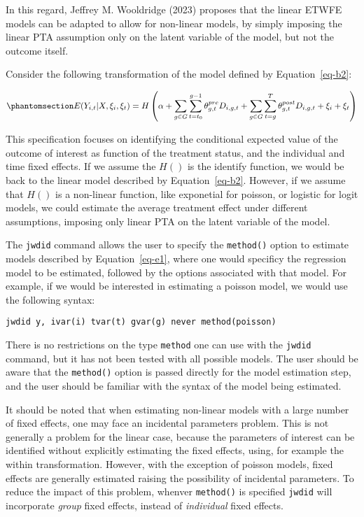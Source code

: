 \documentclass[
  letterpaper,
  DIV=11,
  numbers=noendperiod]{scrartcl}
\begin{document}
In this regard, Jeffrey M. Wooldridge (2023) proposes that the linear
ETWFE models can be adapted to allow for non-linear models, by simply
imposing the linear PTA assumption only on the latent variable of the
model, but not the outcome itself.

Consider the following transformation of the model defined by
Equation~\ref{eq-b2}:

\begin{equation}\phantomsection\label{eq-e1}{E(Y_{i,t}|X,\xi_i,\xi_t) = H\left(\alpha +  \sum_{g \in G} \sum_{t=t_0}^{g-1} \theta^{pre}_{g,t} D_{i,g,t}+ \sum_{g \in G} \sum_{t=g}^{T} \theta^{post}_{g,t} D_{i,g,t} + \xi_i + \xi_t \right)
}\end{equation}

This specification focuses on identifying the conditional expected value
of the outcome of interest as function of the treatment status, and the
individual and time fixed effects. If we assume the \(H()\) is the
identify function, we would be back to the linear model described by
Equation~\ref{eq-b2}. However, if we assume that \(H()\) is a non-linear
function, like exponetial for poisson, or logistic for logit models, we
could estimate the average treatment effect under different assumptions,
imposing only linear PTA on the latent variable of the model.

The \texttt{jwdid} command allows the user to specify the
\texttt{method()} option to estimate models described by
Equation~\ref{eq-e1}, where one would specificy the regression model to
be estimated, followed by the options associated with that model. For
example, if we would be interested in estimating a poisson model, we
would use the following syntax:

\texttt{jwdid\ y,\ ivar(i)\ tvar(t)\ gvar(g)\ never\ method(poisson)}

There is no restrictions on the type \texttt{method} one can use with
the \texttt{jwdid} command, but it has not been tested with all possible
models. The user should be aware that the \texttt{method()} option is
passed directly for the model estimation step, and the user should be
familiar with the syntax of the model being estimated.

It should be noted that when estimating non-linear models with a large
number of fixed effects, one may face an incidental parameters problem.
This is not generally a problem for the linear case, because the
parameters of interest can be identified without explicitly estimating
the fixed effects, using, for example the within transformation.
However, with the exception of poisson models, fixed effects are
generally estimated raising the possibility of incidental parameters. To
reduce the impact of this problem, whenver \texttt{method()} is
specified \texttt{jwdid} will incorporate \emph{group} fixed effects,
instead of \emph{individual} fixed effects.
\end{document}
